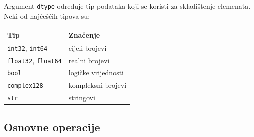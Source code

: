 Argument \texttt{dtype} određuje tip podataka koji se koristi za skladištenje elemenata. Neki od najčešćih tipova su:

\begin{center}
	\begin{tabular}{ll}
		\textbf{Tip} & \textbf{Značenje} \\ \hline
		\texttt{int32}, \texttt{int64} & cijeli brojevi \\
		\texttt{float32}, \texttt{float64} & realni brojevi \\
		\texttt{bool} & logičke vrijednosti \\
		\texttt{complex128} & kompleksni brojevi \\
		\texttt{str} & stringovi  \\ \hline \hline
	\end{tabular} 
\end{center}

\subsection*{Osnovne operacije}

